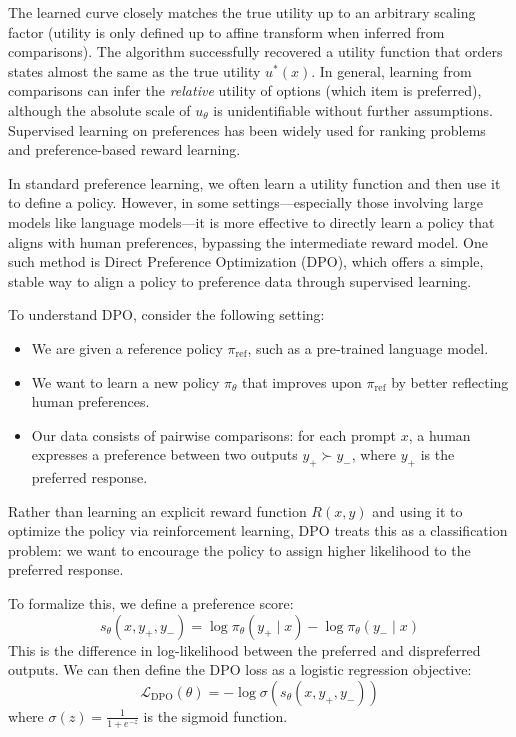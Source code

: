 \documentclass[
  letterpaper,
  numbers=noenddot,
  DIV=11]{scrreprt}
\providecommand{\tightlist}{%
  \setlength{\itemsep}{0pt}\setlength{\parskip}{0pt}}\usepackage{longtable,booktabs,array}
\theoremstyle{plain}
\theoremstyle{definition}
\theoremstyle{remark}
\begin{document}
The learned curve closely matches the true utility up to an arbitrary
scaling factor (utility is only defined up to affine transform when
inferred from comparisons). The algorithm successfully recovered a
utility function that orders states almost the same as the true utility
\(u^*(x)\). In general, learning from comparisons can infer the
\emph{relative} utility of options (which item is preferred), although
the absolute scale of \(u_\theta\) is unidentifiable without further
assumptions. Supervised learning on preferences has been widely used for
ranking problems and preference-based reward learning.

In standard preference learning, we often learn a utility function and
then use it to define a policy. However, in some settings---especially
those involving large models like language models---it is more effective
to directly learn a policy that aligns with human preferences, bypassing
the intermediate reward model. One such method is Direct Preference
Optimization (DPO), which offers a simple, stable way to align a policy
to preference data through supervised learning.

To understand DPO, consider the following setting:

\begin{itemize}
\tightlist
\item
  We are given a reference policy \(\pi_{\text{ref}}\), such as a
  pre-trained language model.
\item
  We want to learn a new policy \(\pi_\theta\) that improves upon
  \(\pi_{\text{ref}}\) by better reflecting human preferences.
\item
  Our data consists of pairwise comparisons: for each prompt \(x\), a
  human expresses a preference between two outputs \(y_+ \succ y_-\),
  where \(y_+\) is the preferred response.
\end{itemize}

Rather than learning an explicit reward function \(R(x, y)\) and using
it to optimize the policy via reinforcement learning, DPO treats this as
a classification problem: we want to encourage the policy to assign
higher likelihood to the preferred response.

To formalize this, we define a preference score: \[
s_\theta(x, y_+, y_-) = \log \pi_\theta(y_+ \mid x) - \log \pi_\theta(y_- \mid x)
\] This is the difference in log-likelihood between the preferred and
dispreferred outputs. We can then define the DPO loss as a logistic
regression objective: \[
\mathcal{L}_{\text{DPO}}(\theta) = -\log \sigma\left(s_\theta(x, y_+, y_-)\right)
\] where \(\sigma(z) = \frac{1}{1 + e^{-z}}\) is the sigmoid function.
\end{document}
